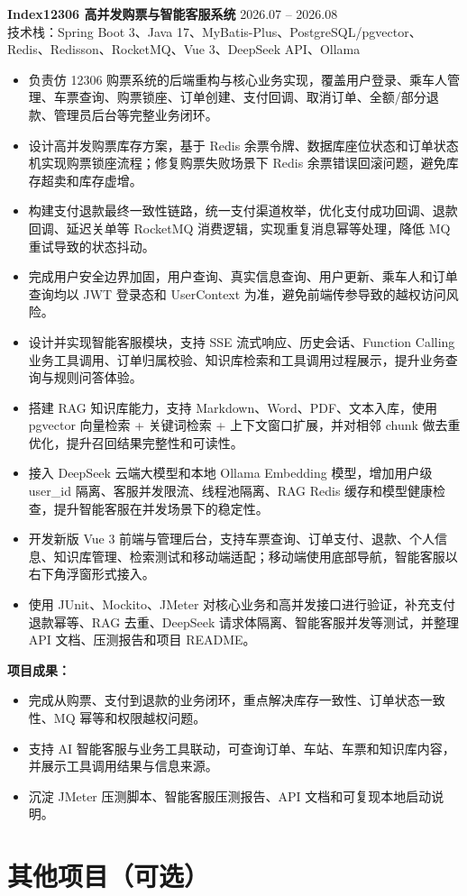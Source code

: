 \documentclass[11pt,a4paper]{ctexart}
\newcommand{\resumeItem}[1]{\item #1}
\newcommand{\projectHeading}[3]{
  \textbf{#1} \hfill #2 \\
  {\color{textgray}技术栈：#3}
}
\begin{document}
\projectHeading
  {Index12306 高并发购票与智能客服系统}{2026.07 -- 2026.08}
  {Spring Boot 3、Java 17、MyBatis-Plus、PostgreSQL/pgvector、Redis、Redisson、RocketMQ、Vue 3、DeepSeek API、Ollama}

\begin{itemize}
  \resumeItem{负责仿 12306 购票系统的后端重构与核心业务实现，覆盖用户登录、乘车人管理、车票查询、购票锁座、订单创建、支付回调、取消订单、全额/部分退款、管理员后台等完整业务闭环。}
  \resumeItem{设计高并发购票库存方案，基于 Redis 余票令牌、数据库座位状态和订单状态机实现购票锁座流程；修复购票失败场景下 Redis 余票错误回滚问题，避免库存超卖和库存虚增。}
  \resumeItem{构建支付退款最终一致性链路，统一支付渠道枚举，优化支付成功回调、退款回调、延迟关单等 RocketMQ 消费逻辑，实现重复消息幂等处理，降低 MQ 重试导致的状态抖动。}
  \resumeItem{完成用户安全边界加固，用户查询、真实信息查询、用户更新、乘车人和订单查询均以 JWT 登录态和 UserContext 为准，避免前端传参导致的越权访问风险。}
  \resumeItem{设计并实现智能客服模块，支持 SSE 流式响应、历史会话、Function Calling 业务工具调用、订单归属校验、知识库检索和工具调用过程展示，提升业务查询与规则问答体验。}
  \resumeItem{搭建 RAG 知识库能力，支持 Markdown、Word、PDF、文本入库，使用 pgvector 向量检索 + 关键词检索 + 上下文窗口扩展，并对相邻 chunk 做去重优化，提升召回结果完整性和可读性。}
  \resumeItem{接入 DeepSeek 云端大模型和本地 Ollama Embedding 模型，增加用户级 user\_id 隔离、客服并发限流、线程池隔离、RAG Redis 缓存和模型健康检查，提升智能客服在并发场景下的稳定性。}
  \resumeItem{开发新版 Vue 3 前端与管理后台，支持车票查询、订单支付、退款、个人信息、知识库管理、检索测试和移动端适配；移动端使用底部导航，智能客服以右下角浮窗形式接入。}
  \resumeItem{使用 JUnit、Mockito、JMeter 对核心业务和高并发接口进行验证，补充支付退款幂等、RAG 去重、DeepSeek 请求体隔离、智能客服并发等测试，并整理 API 文档、压测报告和项目 README。}
\end{itemize}

\vspace{2pt}
\textbf{项目成果：}
\begin{itemize}
  \resumeItem{完成从购票、支付到退款的业务闭环，重点解决库存一致性、订单状态一致性、MQ 幂等和权限越权问题。}
  \resumeItem{支持 AI 智能客服与业务工具联动，可查询订单、车站、车票和知识库内容，并展示工具调用结果与信息来源。}
  \resumeItem{沉淀 JMeter 压测脚本、智能客服压测报告、API 文档和可复现本地启动说明。}
\end{itemize}

\section{其他项目（可选）}
\end{document}
